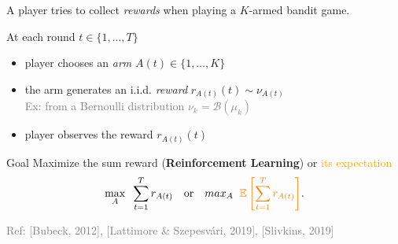 \begin{frameO}

    A player tries to collect \emph{rewards} when playing a $K$-armed \slotmachine{} bandit game.

    \begin{lightblock}{}
        At each round $t\in\{1,\dots,T\}$
        \begin{itemize}
            \item
                player chooses an \emph{arm} \slotmachine{} \(A(t) \in \{1,\dots,K\}\)
            \item
                the arm generates an i.i.d. \emph{reward} $r_{A(t)}(t) \sim \nu_{A(t)}$\\
                \textcolor{gray}{Ex: from a Bernoulli distribution $\nu_{k} = \mathcal{B}(\mu_k)$}
            \item
                player observes the reward $r_{A(t)}(t)$
        \end{itemize}
    \end{lightblock}

    \pause

    \begin{colorblock}{Goal}
        Maximize the sum reward (\textbf{Reinforcement Learning}) or \textcolor{orange}{its expectation}
        \[\max_{A} \;\; \sum\limits_{t=1}^{T} r_{A(t)} \,\,\,\,\,\, \text{or} \,\,\,\,\,\, max_{A} \;\; \textcolor{orange}{ \mathbb{E}\left[\sum\limits_{t=1}^{T} r_{A(t)}\right] }.\]
    \end{colorblock}

    \vfill{}
    \hfill{} {\small \textcolor{gray}{Ref: [Bubeck, 2012], [Lattimore \& Szepesvári, 2019], [Slivkins, 2019]}}

\end{frameO}

